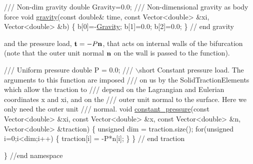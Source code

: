 \begin{DoxyCodeInclude}
\textcolor{comment}{}
\textcolor{comment}{ /// Non-dim gravity}
\textcolor{comment}{} \textcolor{keywordtype}{double} Gravity=0.0;
\textcolor{comment}{}
\textcolor{comment}{ /// Non-dimensional gravity as body force}
\textcolor{comment}{} \textcolor{keywordtype}{void} \hyperlink{namespaceGlobal__Parameters_a200109847bf4cc26da4d00e8d68d569e}{gravity}(\textcolor{keyword}{const} \textcolor{keywordtype}{double}& time,
              \textcolor{keyword}{const} Vector<double> &xi,
              Vector<double> &b)
 \{
  b[0]=-\hyperlink{namespaceGlobal__Parameters_a335000b5db4206486a116ae0468d2d0c}{Gravity}; 
  b[1]=0.0;
  b[2]=0.0;
 \} \textcolor{comment}{// end gravity}

\end{DoxyCodeInclude}


and the pressure load, $ {\bf t} = -P {\bf n} $, that acts on internal walls of the bifurcation (note that the outer unit normal $ {\bf n} $ on the wall is passed to the function).


\begin{DoxyCodeInclude}
\textcolor{comment}{}
\textcolor{comment}{ /// Uniform pressure}
\textcolor{comment}{} \textcolor{keywordtype}{double} P = 0.0;
\textcolor{comment}{}
\textcolor{comment}{ /// \(\backslash\)short Constant pressure load. The arguments to this function are imposed}
\textcolor{comment}{ /// on us by the SolidTractionElements which allow the traction to }
\textcolor{comment}{ /// depend on the Lagrangian and Eulerian coordinates x and xi, and on the }
\textcolor{comment}{ /// outer unit normal to the surface. Here we only need the outer unit}
\textcolor{comment}{ /// normal.}
\textcolor{comment}{} \textcolor{keywordtype}{void} \hyperlink{namespaceGlobal__Parameters_a7dc25ca2abd48b7f1bffb2d6129f02bd}{constant\_pressure}(\textcolor{keyword}{const} Vector<double> &xi, \textcolor{keyword}{const} Vector<double> &x,
                        \textcolor{keyword}{const} Vector<double> &n, Vector<double> &traction)
 \{
  \textcolor{keywordtype}{unsigned} dim = traction.size();
  \textcolor{keywordflow}{for}(\textcolor{keywordtype}{unsigned} i=0;i<dim;i++)
   \{
    traction[i] = -P*n[i];
   \}
 \} \textcolor{comment}{// end traction}
 
 
\} \textcolor{comment}{//end namespace}

\end{DoxyCodeInclude}




